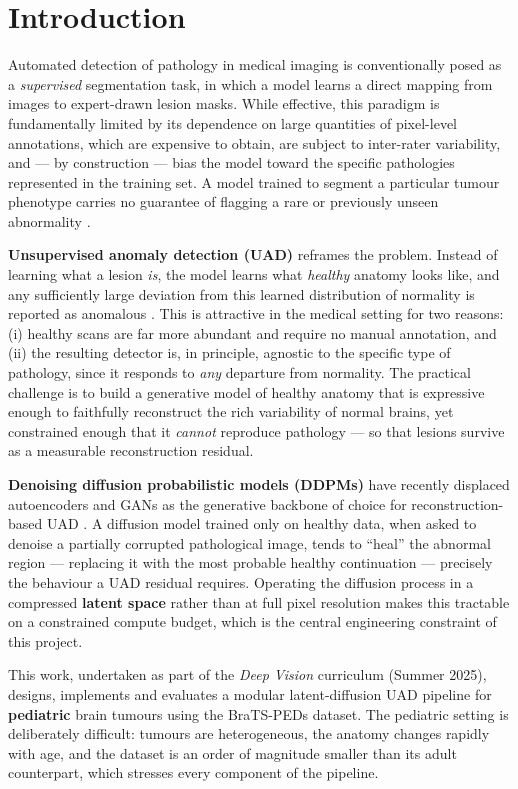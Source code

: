 \documentclass[12pt, a4paper]{article}
\begin{document}
\section{Introduction}
Automated detection of pathology in medical imaging is conventionally posed as a \emph{supervised} segmentation task, in which a model learns a direct mapping from images to expert-drawn lesion masks. While effective, this paradigm is fundamentally limited by its dependence on large quantities of pixel-level annotations, which are expensive to obtain, are subject to inter-rater variability, and — by construction — bias the model toward the specific pathologies represented in the training set. A model trained to segment a particular tumour phenotype carries no guarantee of flagging a rare or previously unseen abnormality \cite{baur2021}.

\textbf{Unsupervised anomaly detection (UAD)} reframes the problem. Instead of learning what a lesion \emph{is}, the model learns what \emph{healthy} anatomy looks like, and any sufficiently large deviation from this learned distribution of normality is reported as anomalous \cite{schlegl2019, baur2021}. This is attractive in the medical setting for two reasons: (i) healthy scans are far more abundant and require no manual annotation, and (ii) the resulting detector is, in principle, agnostic to the specific type of pathology, since it responds to \emph{any} departure from normality. The practical challenge is to build a generative model of healthy anatomy that is expressive enough to faithfully reconstruct the rich variability of normal brains, yet constrained enough that it \emph{cannot} reproduce pathology — so that lesions survive as a measurable reconstruction residual.

\textbf{Denoising diffusion probabilistic models (DDPMs)} \cite{ho2020} have recently displaced autoencoders and GANs as the generative backbone of choice for reconstruction-based UAD \cite{wyatt2022, behrendt2023}. A diffusion model trained only on healthy data, when asked to denoise a partially corrupted pathological image, tends to ``heal'' the abnormal region — replacing it with the most probable healthy continuation — precisely the behaviour a UAD residual requires. Operating the diffusion process in a compressed \textbf{latent space} \cite{rombach2022} rather than at full pixel resolution makes this tractable on a constrained compute budget, which is the central engineering constraint of this project.

This work, undertaken as part of the \emph{Deep Vision} curriculum (Summer 2025), designs, implements and evaluates a modular latent-diffusion UAD pipeline for \textbf{pediatric} brain tumours using the BraTS-PEDs dataset. The pediatric setting is deliberately difficult: tumours are heterogeneous, the anatomy changes rapidly with age, and the dataset is an order of magnitude smaller than its adult counterpart, which stresses every component of the pipeline.
\end{document}
